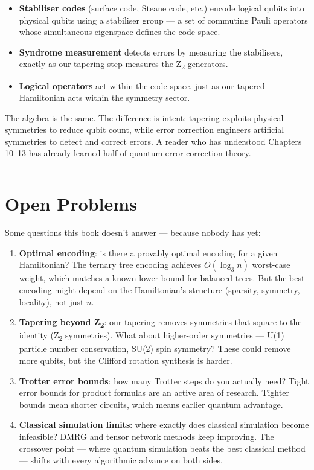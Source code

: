 \documentclass[
  11pt,
  oneside]{book}
\providecommand{\tightlist}{%
  \setlength{\itemsep}{0pt}\setlength{\parskip}{0pt}}
\begin{document}
\begin{itemize}
\tightlist
\item
  \textbf{Stabiliser codes} (surface code, Steane code, etc.) encode
  logical qubits into physical qubits using a stabiliser group --- a set
  of commuting Pauli operators whose simultaneous eigenspace defines the
  code space.
\item
  \textbf{Syndrome measurement} detects errors by measuring the
  stabilisers, exactly as our tapering step measures the Z\textsubscript{2} generators.
\item
  \textbf{Logical operators} act within the code space, just as our
  tapered Hamiltonian acts within the symmetry sector.
\end{itemize}

The algebra is the same. The difference is intent: tapering exploits
physical symmetries to reduce qubit count, while error correction
engineers artificial symmetries to detect and correct errors. A reader
who has understood Chapters 10--13 has already learned half of quantum
error correction theory.

\begin{center}\rule{0.5\linewidth}{0.5pt}\end{center}

\section{Open Problems}\label{open-problems}

Some questions this book doesn't answer --- because nobody has yet:

\begin{enumerate}
\def\labelenumi{\arabic{enumi}.}
\item
  \textbf{Optimal encoding}: is there a provably optimal encoding for a
  given Hamiltonian? The ternary tree encoding achieves \(O(\log_3 n)\)
  worst-case weight, which matches a known lower bound for balanced
  trees. But the best encoding might depend on the Hamiltonian's
  structure (sparsity, symmetry, locality), not just \(n\).
\item
  \textbf{Tapering beyond Z\textsubscript{2}}: our tapering removes symmetries that
  square to the identity (Z\textsubscript{2} symmetries). What about higher-order
  symmetries --- U(1) particle number conservation, SU(2) spin symmetry?
  These could remove more qubits, but the Clifford rotation synthesis is
  harder.
\item
  \textbf{Trotter error bounds}: how many Trotter steps do you actually
  need? Tight error bounds for product formulas are an active area of
  research. Tighter bounds mean shorter circuits, which means earlier
  quantum advantage.
\item
  \textbf{Classical simulation limits}: where exactly does classical
  simulation become infeasible? DMRG and tensor network methods keep
  improving. The crossover point --- where quantum simulation beats the
  best classical method --- shifts with every algorithmic advance on
  both sides.
\end{enumerate}
\end{document}
